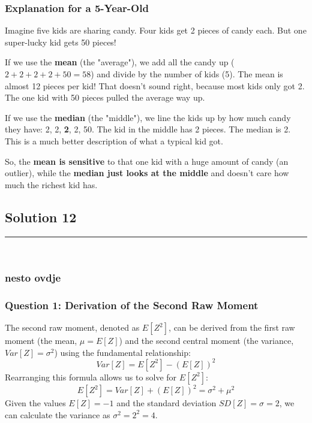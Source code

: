 \documentclass{article}
\begin{document}
\subsubsection*{\normalfont Explanation for a 5-Year-Old}
\parbox{\textwidth}{
Imagine five kids are sharing candy. Four kids get 2 pieces of candy each. But one super-lucky kid gets 50 pieces!

\vspace{0.5em}

If we use the \textbf{mean} (the "average"), we add all the candy up ($2+2+2+2+50 = 58$) and divide by the number of kids (5). The mean is almost 12 pieces per kid! That doesn't sound right, because most kids only got 2. The one kid with 50 pieces pulled the average way up.

\vspace{0.5em}

If we use the \textbf{median} (the "middle"), we line the kids up by how much candy they have: 2, 2, \textbf{2}, 2, 50. The kid in the middle has 2 pieces. The median is 2. This is a much better description of what a typical kid got.

\vspace{0.5em}

So, the \textbf{mean is sensitive} to that one kid with a huge amount of candy (an outlier), while the \textbf{median just looks at the middle} and doesn't care how much the richest kid has.
}

\newpage

\subsection*{Solution 12}
\noindent\rule{\textwidth}{0.4pt}\\
\subsubsection*{nesto ovdje}

\subsubsection*{Question 1: Derivation of the Second Raw Moment}

\parbox{\textwidth}{
The second raw moment, denoted as $E[Z^2]$, can be derived from the first raw moment (the mean, $\mu = E[Z]$) and the second central moment (the variance, $Var[Z] = \sigma^2$) using the fundamental relationship:
$$ Var[Z] = E[Z^2] - (E[Z])^2 $$
Rearranging this formula allows us to solve for $E[Z^2]$:
$$ E[Z^2] = Var[Z] + (E[Z])^2 = \sigma^2 + \mu^2 $$
Given the values $E[Z] = -1$ and the standard deviation $SD[Z] = \sigma = 2$, we can calculate the variance as $\sigma^2 = 2^2 = 4$.
}
\end{document}
